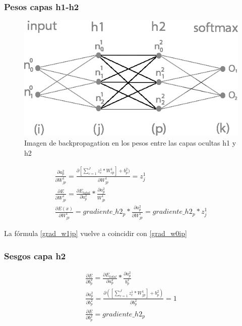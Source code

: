\subsubsection{Pesos capas h1-h2}

\begin{figure}[H]
	\centering
	\includegraphics[scale=0.35]{imagenes/nn_2_capa_pesos_h1_h2.jpg}  
	\caption{Imagen de backpropagation en los pesos entre las capas ocultas h1 y h2}
	\label{fig:nn_2_pesos_h1_h2}
\end{figure}


\begin{gather}
	\frac{\partial a^2_p }{\partial W^1_{jp} } = \frac{\partial [\sum_{c=1}^{J} z^1_c * W^1_{cp}] + b^2_p)}{\partial W^1_{jp} } = z^1_j \\
	\frac{\partial E}{\partial W^1_{jp}} = \frac{\partial E_{total} }{\partial a^2_p } * \frac{\partial a^2_p}{W^1_{jp}} \\
	\frac{\partial E(x) }{\partial W^1_{jp} } = gradiente\_h2_p * \frac{\partial a^2_p }{\partial W^1_{jp} } = gradiente\_h2_p * z^1_j 
	\label{grad_w1jp}
\end{gather}

La fórmula \ref{grad_w1jp} vuelve a coincidir con \ref{grad_w0ip}


\subsubsection{Sesgos capa h2}

\begin{gather}
	\frac{\partial E}{\partial b^2_p} = \frac{\partial E_{total} }{\partial a^2_p } * \frac{\partial a^2_p}{b^2_p} \\
	\frac{\partial a^2_p }{\partial b^2_p } = \frac{\partial ([\sum_{c=1}^{J} z^1_c * W^1_{jp}] + b^2_p) }{\partial b^2_p } = 1 \\
	\frac{\partial E}{\partial b^2_p} = gradiente\_h2_p
	\label{grad_b2p}
\end{gather}


